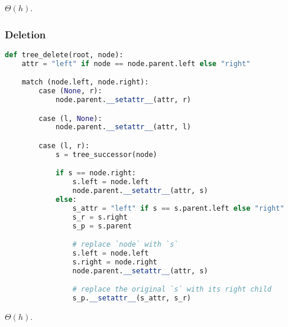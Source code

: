 \documentclass[11pt]{article}
\begin{document}
\begin{rtime*}
$\Theta(h)$.
\end{rtime*}

\subsubsection{Deletion}

\begin{lstlisting}[language=Python]
def tree_delete(root, node):
    attr = "left" if node == node.parent.left else "right"

    match (node.left, node.right):
        case (None, r):
            node.parent.__setattr__(attr, r)

        case (l, None):
            node.parent.__setattr__(attr, l)

        case (l, r):
            s = tree_successor(node)

            if s == node.right:
                s.left = node.left
                node.parent.__setattr__(attr, s)
            else:
                s_attr = "left" if s == s.parent.left else "right"
                s_r = s.right
                s_p = s.parent

                # replace `node` with `s`
                s.left = node.left
                s.right = node.right
                node.parent.__setattr__(attr, s)

                # replace the original `s` with its right child
                s_p.__setattr__(s_attr, s_r)
\end{lstlisting}

\begin{rtime*}
$\Theta(h)$.
\end{rtime*}
\end{document}
